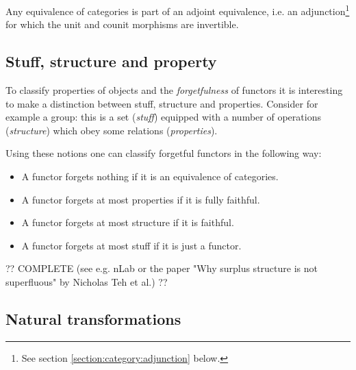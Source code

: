 
    \begin{property}
        Any equivalence of categories is part of an adjoint equivalence, i.e. an adjunction\footnote{See section \ref{section:category:adjunction} below.} for which the unit and counit morphisms are invertible.
    \end{property}

\subsection{Stuff, structure and property}

    To classify properties of objects and the \textit{forgetfulness} of functors it is interesting to make a distinction between stuff, structure and properties. Consider for example a group: this is a set (\textit{stuff}) equipped with a number of operations (\textit{structure}) which obey some relations (\textit{properties}).

    Using these notions one can classify forgetful functors in the following way:
    \begin{itemize}
        \item A functor forgets nothing if it is an equivalence of categories.
        \item A functor forgets at most properties if it is fully faithful.
        \item A functor forgets at most structure if it is faithful.
        \item A functor forgets at most stuff if it is just a functor.
    \end{itemize}

    ?? COMPLETE (see e.g. nLab or the paper "Why surplus structure is not superfluous" by Nicholas Teh et al.) ??

\subsection{Natural transformations}

